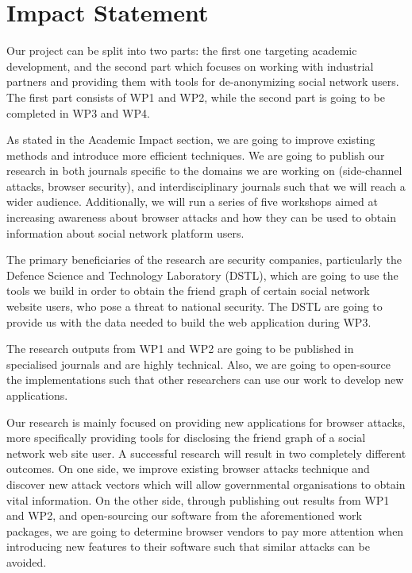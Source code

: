 \documentclass[a4paper,11pt]{article}
\begin{document}
\newpage
\section*{Impact Statement}

%
Our project can be split into two parts: the first one targeting academic development, and the second part which focuses on working with industrial partners and providing them with tools for de-anonymizing social network users. The first part consists of WP1 and WP2, while the second part is going to be completed in WP3 and WP4.

As stated in the Academic Impact section, we are going to improve existing methods and introduce more efficient techniques. We are going to publish our research in both journals specific to the domains we are working on (side-channel attacks, browser security), and interdisciplinary journals such that we will reach a wider audience. Additionally, we will run a series of five workshops aimed at increasing awareness about browser attacks and how they can be used to obtain information about social network platform users.

The primary beneficiaries of the research are security companies, particularly the Defence Science and Technology Laboratory (DSTL), which are going to use the tools we build in order to obtain the friend graph of certain social network website users, who pose a threat to national security. The DSTL are going to provide us with the data needed to build the web application during WP3.

The research outputs from WP1 and WP2 are going to be published in specialised journals and are highly technical. Also, we are going to open-source the implementations such that other researchers can use our work to develop new applications.

Our research is mainly focused on providing new applications for browser attacks, more specifically providing tools for disclosing the friend graph of a social network web site user. A successful research will result in two completely different outcomes. On one side, we improve existing browser attacks technique and discover new attack vectors which will allow governmental organisations to obtain vital information. On the other side, through publishing out results from WP1 and WP2, and open-sourcing our software from the aforementioned work packages, we are going to determine browser vendors to pay more attention when introducing new features to their software such that similar attacks can be avoided. 
\end{document}
